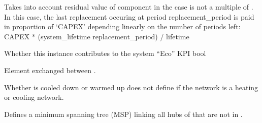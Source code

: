 \documentclass[letterpaper,10pt,english]{sphinxmanual}
\begin{document}
\begin{fulllineitems}
\begin{fulllineitems}
\sphinxAtStartPar
Takes into account residual value of component in the case  is not a multiple of .
In this case, the last replacement occuring at period replacement\_period is paid in proportion of ‘CAPEX’
depending linearly on the number of periods left:
CAPEX * (system\_lifetime \sphinxhyphen{} replacement\_period) / lifetime

\end{fulllineitems}


\begin{fulllineitems}
\label{\detokenize{generated/tamos.network.HREThermalNetwork:tamos.network.HREThermalNetwork.eco_count}}
\pysigstartsignatures
{}
\pysigstopsignatures
\sphinxAtStartPar
Whether this instance contributes to the system “Eco” KPI
bool

\end{fulllineitems}


\begin{fulllineitems}
\label{\detokenize{generated/tamos.network.HREThermalNetwork:tamos.network.HREThermalNetwork.element}}
\pysigstartsignatures
{}
\pysigstopsignatures
\sphinxAtStartPar
Element exchanged between .

\sphinxAtStartPar
Whether  is cooled down or warmed up does not define if the network is a heating or cooling network.

\end{fulllineitems}


\begin{fulllineitems}
\label{\detokenize{generated/tamos.network.HREThermalNetwork:tamos.network.HREThermalNetwork.generate_MSP}}
\pysigstartsignatures
{}
\pysigstopsignatures
\sphinxAtStartPar
Defines a minimum spanning tree (MSP) linking all hubs of  that are not in .


\end{fulllineitems}
\end{fulllineitems}
\end{document}
